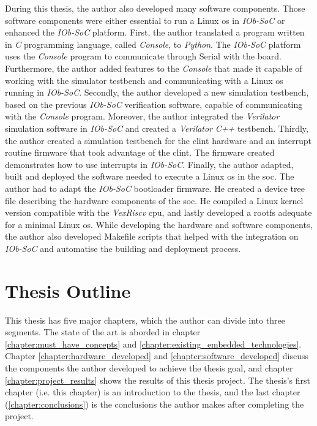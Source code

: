 During this thesis, the author also developed many software components. Those software components were either essential to run a Linux \acrshort{os} in \textit{IOb-SoC} or enhanced the \textit{IOb-SoC} platform. First, the author translated a program written in \textit{C} programming language, called \textit{Console}, to \textit{Python}. The \textit{IOb-SoC} platform uses the \textit{Console} program to communicate through Serial with the board. Furthermore, the author added features to the \textit{Console} that made it capable of working with the simulator testbench and communicating with a Linux \acrshort{os} running in \textit{IOb-SoC}. Secondly, the author developed a new simulation testbench, based on the previous \textit{IOb-SoC} verification software, capable of communicating with the \textit{Console} program. Moreover, the author integrated the \textit{Verilator}~\cite{snyder2010verilator} simulation software in \textit{IOb-SoC} and created a \textit{Verilator} \textit{C++} testbench. Thirdly, the author created a simulation testbench for the \acrshort{clint} hardware and an interrupt routine firmware that took advantage of the \acrshort{clint}. The firmware created demonstrates how to use interrupts in \textit{IOb-SoC}. Finally, the author adapted, built and deployed the software needed to execute a Linux \acrshort{os} in the \acrshort{soc}. The author had to adapt the \textit{IOb-SoC} bootloader firmware. He created a device tree file describing the hardware components of the \acrshort{soc}. He compiled a Linux kernel version compatible with the \textit{VexRiscv} \acrshort{cpu}, and lastly developed a \acrshort{rootfs} adequate for a minimal Linux \acrshort{os}. While developing the hardware and software components, the author also developed Makefile scripts that helped with the integration on \textit{IOb-SoC} and automatise the building and deployment process.


\section{Thesis Outline}
\label{section:thesis_outline}
This thesis has five major chapters, which the author can divide into three segments. The state of the art is aborded in chapter \ref{chapter:must_have_concepts} and \ref{chapter:existing_embedded_technologies}. Chapter \ref{chapter:hardware_developed} and \ref{chapter:software_developed} discuss the components the author developed to achieve the thesis goal, and chapter \ref{chapter:project_results} shows the results of this thesis project. The thesis's first chapter (i.e. this chapter) is an introduction to the thesis, and the last chapter (\ref{chapter:conclusions}) is the conclusions the author makes after completing the project.

